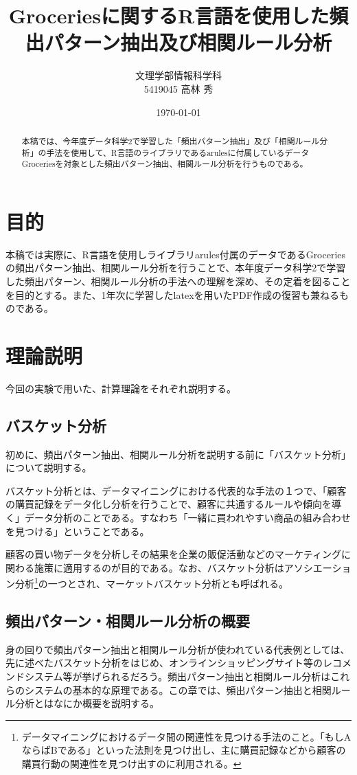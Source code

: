 \documentclass[dvipdfmx]{jsarticle}
\title{Groceriesに関するR言語を使用した頻出パターン抽出及び相関ルール分析}
\author{文理学部情報科学科\\5419045 高林 秀}
\date{\today}
\begin{document}
\maketitle

\begin{abstract}
  本稿では、今年度データ科学2で学習した「頻出パターン抽出」及び「相関ルール分析」の手法を使用して、R言語のライブラリであるarulesに付属しているデータGroceriesを対象とした頻出パターン抽出、相関ルール分析を行うものである。

\end{abstract}

\section{目的}
本稿では実際に、R言語を使用しライブラリarules付属のデータであるGroceriesの頻出パターン抽出、相関ルール分析を行うことで、本年度データ科学2で学習した頻出パターン、相関ルール分析の手法への理解を深め、その定着を図ることを目的とする。また、1年次に学習したlatexを用いたPDF作成の復習も兼ねるものである。
\section{理論説明}
今回の実験で用いた、計算理論をそれぞれ説明する。
\subsection{バスケット分析}
初めに、頻出パターン抽出、相関ルール分析を説明する前に「バスケット分析」について説明する。\par
バスケット分析とは、データマイニングにおける代表的な手法の１つで、「顧客の購買記録をデータ化し分析を行うことで、顧客に共通するルールや傾向を導く」データ分析のことである。すなわち「一緒に買われやすい商品の組み合わせを見つける」ということである。\par
顧客の買い物データを分析しその結果を企業の販促活動などのマーケティングに関わる施策に適用するのが目的である。なお、バスケット分析はアソシエーション分析\footnote{データマイニングにおけるデータ間の関連性を見つける手法のこと。「もしAならばBである」といった法則を見つけ出し、主に購買記録などから顧客の購買行動の関連性を見つけ出すのに利用される。}の一つとされ、マーケットバスケット分析とも呼ばれる。\par
\subsection{頻出パターン・相関ルール分析の概要}
身の回りで頻出パターン抽出と相関ルール分析が使われている代表例としては、先に述べたバスケット分析をはじめ、オンラインショッピングサイト等のレコメンドシステム等が挙げられるだろう。頻出パターン抽出と相関ルール分析はこれらのシステムの基本的な原理である。この章では、頻出パターン抽出と相関ルール分析とはなにか概要を説明する。
\end{document}

